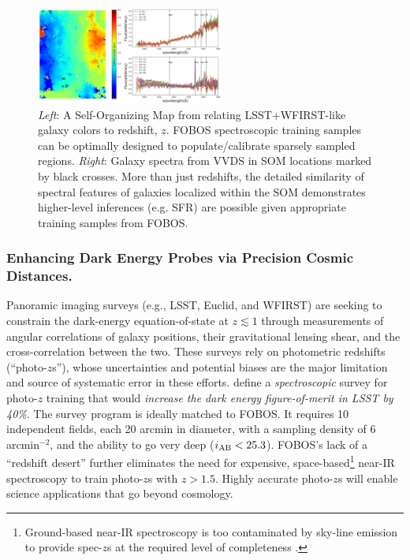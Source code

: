 
\begin{figure} %
\includegraphics[width=0.55\textwidth]{figs/Hemmati18_Fig8_VVDS_spec.png}
\caption{\small {\it Left}: A Self-Organizing Map
\citep[SOM;][]{1990Natur.346...24K} from \citet{hemmati18} relating
LSST+WFIRST-like galaxy colors to redshift, $z$. FOBOS spectroscopic
training samples can be optimally designed to populate/calibrate
sparsely sampled regions. {\it Right}: Galaxy spectra from VVDS
\citep{2005A&A...439..845L} in SOM locations marked by black crosses.
More than just redshifts, the detailed similarity of spectral
features of galaxies localized within the SOM demonstrates
higher-level inferences (e.g. SFR) are possible given appropriate
training samples from FOBOS.} \label{fig:SOM} \end{figure}

\subsubsection{Enhancing Dark Energy Probes via Precision Cosmic Distances.}
\label{sec:cosmology}

Panoramic imaging surveys (e.g., LSST, Euclid, and WFIRST) are seeking to constrain the dark-energy
equation-of-state at $z \lesssim 1$ through measurements of angular correlations of galaxy positions, their
gravitational lensing shear, and the cross-correlation between the two.  These surveys rely on photometric redshifts
(``photo-$z$s''), whose uncertainties and potential biases are the major limitation and source of systematic error in
these efforts.  \citet{newman15} define a \emph{spectroscopic} survey for photo-$z$ training that would \emph{increase
the dark energy figure-of-merit in LSST by 40\%}.  The survey program is ideally matched to FOBOS.  It requires 10
independent fields, each 20 arcmin in diameter, with a sampling density of 6 arcmin$^{-2}$, and the ability to go very
deep ($i_{\rm AB} < 25.3$).  FOBOS's lack of a ``redshift desert'' further eliminates the need for expensive, space-based\footnote{Ground-based near-IR spectroscopy is too contaminated by
sky-line emission to provide spec-$z$s at the required level of completeness \citep{newman15}.} near-IR spectroscopy to train photo-$z$s with $z > 1.5$.  Highly accurate photo-$z$s will enable science applications that go beyond cosmology.

